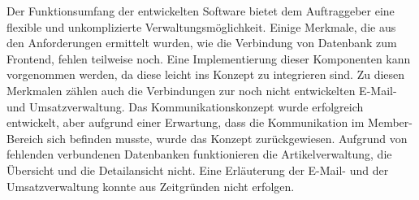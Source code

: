 Der Funktionsumfang der entwickelten Software bietet dem Auftraggeber eine flexible und unkomplizierte Verwaltungsmöglichkeit.
Einige Merkmale, die aus den Anforderungen ermittelt wurden, wie die Verbindung von Datenbank zum Frontend, fehlen teilweise noch. Eine Implementierung dieser Komponenten kann vorgenommen werden, da diese leicht ins Konzept zu integrieren sind. Zu diesen Merkmalen zählen auch die Verbindungen zur noch nicht entwickelten E-Mail- und Umsatzverwaltung. Das Kommunikationskonzept wurde erfolgreich entwickelt, aber aufgrund einer  Erwartung, dass die Kommunikation im Member-Bereich sich befinden musste, wurde das Konzept zurückgewiesen. Aufgrund von fehlenden verbundenen Datenbanken funktionieren die Artikelverwaltung, die Übersicht und die Detailansicht nicht. Eine Erläuterung der E-Mail- und der Umsatzverwaltung konnte aus Zeitgründen nicht erfolgen.


